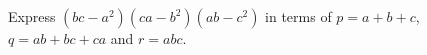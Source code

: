 Express $\left(bc-a^2\right)\left(ca-b^2\right)\left(ab-c^2\right)$ in terms of $p=a+b+c$, $q=ab+bc+ca$ and $r=abc$.
